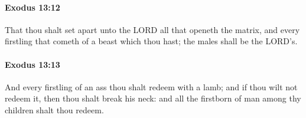 		\paragraph{Exodus 13:12} %
			\label{EXODUS-13-12}

			That thou shalt set apart unto the LORD all that openeth the matrix, and every firstling that cometh of a beast which thou hast; the males shall be the LORD's.


		\paragraph{Exodus 13:13} %
			\label{EXODUS-13-13}

			And every firstling of an ass thou shalt redeem with a lamb; and if thou wilt not redeem it, then thou shalt break his neck: and all the firstborn of man among thy children shalt thou redeem.


